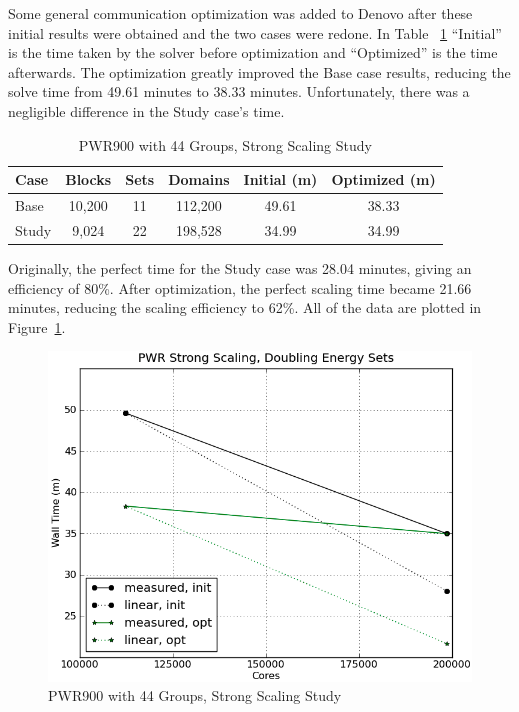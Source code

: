 Some general communication optimization was added to Denovo after these initial results were obtained and the two cases were redone. In Table ~\ref{table:StrongCasesPWR} ``Initial'' is the time taken by the solver before optimization and ``Optimized'' is the time afterwards. The optimization greatly improved the Base case results, reducing the solve time from 49.61 minutes to 38.33 minutes. Unfortunately, there was a negligible difference in the Study case's time. 
%
\begin{table}[!h]
\caption{PWR900 with 44 Groups, Strong Scaling Study}
\begin{center}
\begin{tabular}{| l | c | c | c | c | c |}
\hline
Case & Blocks & Sets & Domains & Initial (m) & Optimized (m) \\[0.5ex]
\hline
Base   & 10,200 & 11 & 112,200 & 49.61 & 38.33 \\
Study & 9,024    & 22 & 198,528 & 34.99 & 34.99 \\
\hline
\end{tabular}
\end{center}
\label{table:StrongCasesPWR}
\end{table}
%
Originally, the perfect time for the Study case was 28.04 minutes, giving an efficiency of 80\%. After optimization, the perfect scaling time became 21.66 minutes, reducing the scaling efficiency to 62\%. All of the data are plotted in Figure~\ref{fig:PWRstrongScaling}. 
\begin{figure}[!h]
  \begin{center}
    \includegraphics [width=.7\textwidth, height=.45\textheight ] {PWRstrongScaling}
  \end{center}
  \caption{PWR900 with 44 Groups, Strong Scaling Study}
  \label{fig:PWRstrongScaling}
\end{figure}

